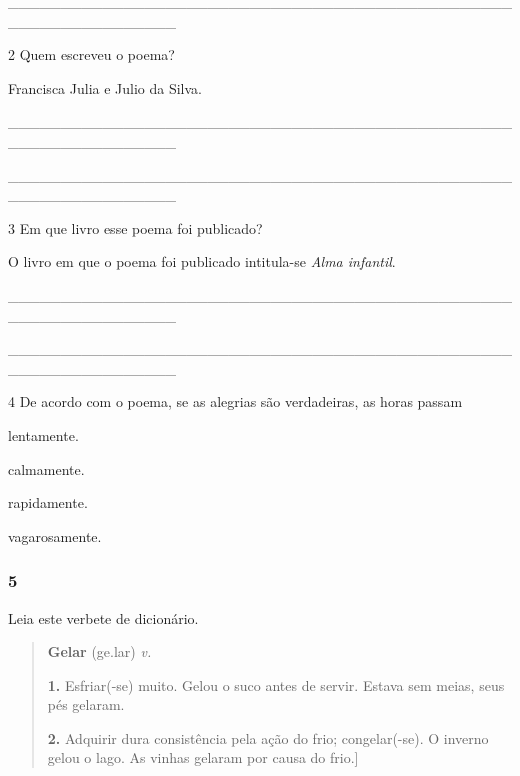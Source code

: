 \begin{boxlist}
{{\_\_\_\_\_\_\_\_\_\_\_\_\_\_\_\_\_\_\_\_\_\_\_\_\_\_\_\_\_\_\_\_\_\_\_\_\_\_\_\_\_\_\_\_\_\_\_\_\_\_\_\_\_\_\_\_\_\_\_\_\_\_\_\_

\num{2} Quem escreveu o poema?

Francisca Julia e Julio da Silva.

\_\_\_\_\_\_\_\_\_\_\_\_\_\_\_\_\_\_\_\_\_\_\_\_\_\_\_\_\_\_\_\_\_\_\_\_\_\_\_\_\_\_\_\_\_\_\_\_\_\_\_\_\_\_\_\_\_\_\_\_\_\_\_\_

\_\_\_\_\_\_\_\_\_\_\_\_\_\_\_\_\_\_\_\_\_\_\_\_\_\_\_\_\_\_\_\_\_\_\_\_\_\_\_\_\_\_\_\_\_\_\_\_\_\_\_\_\_\_\_\_\_\_\_\_\_\_\_\_

\num{3} Em que livro esse poema foi publicado?

O livro em que o poema foi publicado intitula-se \textit{Alma infantil}.

\_\_\_\_\_\_\_\_\_\_\_\_\_\_\_\_\_\_\_\_\_\_\_\_\_\_\_\_\_\_\_\_\_\_\_\_\_\_\_\_\_\_\_\_\_\_\_\_\_\_\_\_\_\_\_\_\_\_\_\_\_\_\_\_

\_\_\_\_\_\_\_\_\_\_\_\_\_\_\_\_\_\_\_\_\_\_\_\_\_\_\_\_\_\_\_\_\_\_\_\_\_\_\_\_\_\_\_\_\_\_\_\_\_\_\_\_\_\_\_\_\_\_\_\_\_\_\_\_

\num{4} De acordo com o poema, se as alegrias são verdadeiras, as horas passam

\begin{escolha}
  \item lentamente.
  \item calmamente.
  \item rapidamente.
  \item vagarosamente.
\end{escolha}


\subsubsection{5}\label{section-48}

Leia este verbete de dicionário.

\begin{quote}
\textbf{Gelar} (ge.lar)
\textit{v.}

\textbf{1.} Esfriar(-se) muito.
Gelou o suco antes de servir.
Estava sem meias, seus pés gelaram.

\textbf{2.} Adquirir dura consistência pela ação do frio; congelar(-se).
O inverno gelou o lago.
As vinhas gelaram por causa do frio.]


\end{quote}}}
\end{boxlist}
